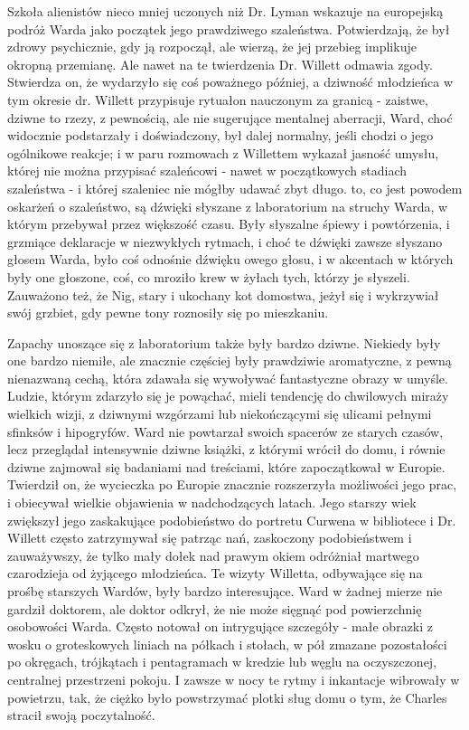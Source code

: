Szkoła alienistów nieco mniej uczonych niż Dr. Lyman wskazuje na europejską podróż Warda jako początek jego prawdziwego szaleństwa. Potwierdzają, że był zdrowy psychicznie, gdy ją rozpoczął, ale wierzą, że jej przebieg implikuje okropną przemianę. Ale nawet na te twierdzenia Dr. Willett odmawia zgody. Stwierdza on, że wydarzyło się coś poważnego później, a  dziwność młodzieńca w tym okresie dr. Willett przypisuje rytuałon nauczonym za granicą - zaistwe, dziwne to rzezy, z pewnością, ale nie sugerujące mentalnej aberracji, Ward, choć widocznie podstarzały i doświadczony, był dalej normalny, jeśli chodzi o jego ogólnikowe reakcje; i w paru rozmowach z Willettem wykazał jasność umysłu, której nie można przypisać szaleńcowi - nawet w początkowych stadiach szaleństwa - i której szaleniec nie mógłby udawać zbyt długo.  to, co jest powodem oskarżeń o szaleństwo, są dźwięki słyszane z laboratorium na struchy Warda, w którym przebywał przez większość czasu. Były słyszalne śpiewy i powtórzenia, i grzmiące deklaracje w niezwykłych rytmach, i choć te dźwięki zawsze słyszano głosem Warda, było coś odnośnie dźwięku owego głosu, i w akcentach w których były one głoszone, coś, co mroziło krew w żyłach tych, którzy je słyszeli. Zauważono też, że Nig, stary i ukochany kot domostwa, jeżył się i wykrzywiał swój grzbiet, gdy pewne tony roznosiły się po mieszkaniu. 

Zapachy unoszące się z laboratorium także były bardzo dziwne. Niekiedy były one bardzo niemiłe, ale znacznie częściej były prawdziwie aromatyczne, z pewną nienazwaną cechą, która zdawała się wywoływać fantastyczne obrazy w umyśle. Ludzie, którym zdarzyło się je powąchać, mieli tendencję do chwilowych miraży wielkich wizji, z dziwnymi wzgórzami lub niekończącymi się ulicami pełnymi sfinksów i hipogryfów. Ward nie powtarzał swoich spacerów ze starych czasów, lecz przeglądał intensywnie dziwne książki, z którymi wrócił do domu, i równie dziwne zajmował się badaniami nad treściami, które zapoczątkował w Europie. Twierdził on, że wycieczka po Europie znacznie rozszerzyła możliwości jego prac, i obiecywał wielkie objawienia w nadchodzących latach. Jego starszy wiek zwiększył jego zaskakujące podobieństwo do portretu Curwena w bibliotece i Dr. Willett często zatrzymywał się patrząc nań, zaskoczony podobieństwem i zauważywszy, że tylko mały dołek nad prawym okiem odróżniał martwego czarodzieja od żyjącego młodzieńca. Te wizyty Willetta, odbywające się na prośbę starszych Wardów, były bardzo interesujące. Ward w żadnej mierze nie gardził doktorem, ale doktor odkrył, że nie może sięgnąć pod powierzchnię osobowości Warda. Często notował on intrygujące szczegóły - małe obrazki z wosku o groteskowych liniach na półkach i stołach, w pół zmazane pozostałości po okręgach, trójkątach i pentagramach w kredzie lub węglu na oczyszczonej, centralnej przestrzeni pokoju. I zawsze w nocy te rytmy i inkantacje wibrowały w powietrzu, tak, że ciężko było powstrzymać plotki sług domu o tym, że Charles stracił swoją poczytalność. 

